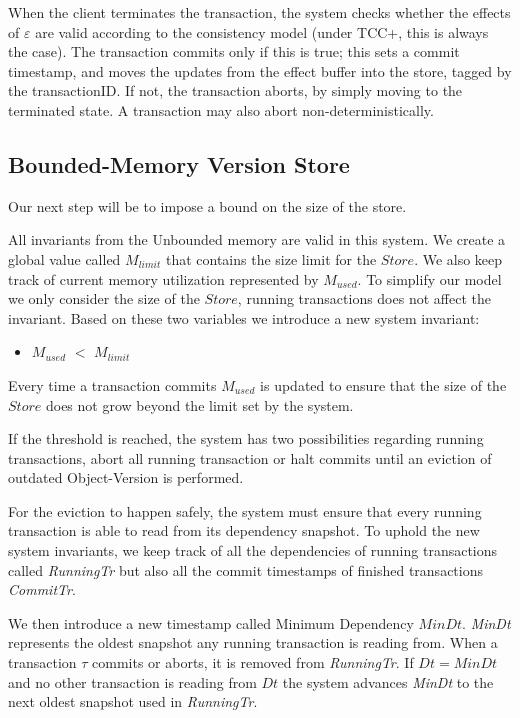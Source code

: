 \documentclass[systeme,french,english]{compas2022}
\newcommand{\commentaire}[2][fromWhom?]{%
  {%
    \color{magenta}{\bfseries\sffamily\scriptsize$\triangleright$(#1:) #2$\triangleleft$}%
  }}
\begin{document}
When the client terminates the transaction, the system checks whether
the effects of $\varepsilon$ are valid according to the consistency model
(under TCC+, this is always the case).
The transaction commits only if this is true; this sets a commit
timestamp, and moves the updates
from the effect buffer into the store, tagged by the transactionID.
If not, the transaction aborts, by simply moving to the terminated
state.
A transaction may also abort non-deterministically.

\subsection{Bounded-Memory Version Store}

Our next step will be to impose a bound on the size of the store.

All invariants from the Unbounded memory are valid in this system.
We create a global value called $\mathit{M_{limit}}$ that contains the size 
limit for the $\mathit{Store}$.
We also keep track of current memory utilization represented by $\mathit{M_{used}}$.
To simplify our model we only consider the size of the $\mathit{Store}$, running transactions does not affect the invariant.
Based on these two variables we introduce a new system invariant:
\begin{itemize}
  \item \emph{$M_{used}$} $<$ \emph{$M_{limit}$}
\end{itemize}

Every time a transaction commits $\mathit{M_{used}}$ is updated to ensure that the size of the $\mathit{Store}$ does not grow beyond the limit set by the system.

If the threshold is reached, the system has two possibilities regarding running transactions, abort all running transaction or halt commits until an eviction of outdated Object-Version is performed.

For the eviction to happen safely, the system must ensure that every running transaction is able to read from its dependency snapshot.
To uphold the new system invariants, we keep track of all the dependencies of running transactions called \emph{RunningTr} but also all the commit timestamps of finished transactions \emph{CommitTr}.

We then introduce a new timestamp called Minimum Dependency $\mathit{MinDt}$.
\emph{MinDt} represents the oldest snapshot any running transaction is reading from.
When a transaction $\tau$ commits or aborts, it is removed from \emph{RunningTr}. 
If $\mathit{Dt= MinDt}$ and no other transaction is reading from $\mathit{Dt}$ the system advances \emph{MinDt} to the next oldest snapshot used in \emph{RunningTr}.
\end{document}
